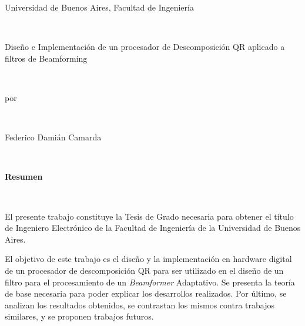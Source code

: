 \newpage
\thispagestyle{empty}
\begin{center} 
		
		Universidad de Buenos Aires, Facultad de Ingeniería

\

Diseño e Implementación de un procesador de Descomposición QR aplicado a filtros de Beamforming

\

por

\

Federico Damián Camarda

\

\textbf{Resumen}

\

\end{center}

El presente trabajo constituye la Tesis de Grado necesaria para obtener el título de Ingeniero Electrónico de la Facultad de Ingeniería de la Universidad de Buenos Aires.

El objetivo de este trabajo es el diseño y la implementación en hardware digital de un procesador de descomposición QR para ser utilizado en el diseño de un filtro para el procesamiento de un \textit{Beamformer} Adaptativo. Se presenta la teoría de base necesaria para poder explicar los desarrollos realizados. Por último, se analizan los resultados obtenidos, se contrastan los mismos contra trabajos similares, y se proponen trabajos futuros.
